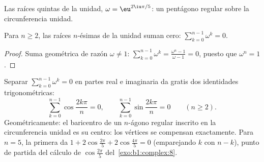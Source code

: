 \begin{omfigure}

{\small Las raíces quintas de la unidad, $\omega = \eu^{2\iu\pi/5}$:
un pentágono regular sobre la circunferencia unidad.}
\end{omfigure}

\begin{proposition}\label{prop:b1:complex:sumroots}
Para $n \geq 2$, las raíces $n$-ésimas de la unidad suman cero:
$\sum_{k=0}^{n-1} \omega^k = 0$.
\end{proposition}

\begin{proof}
Suma geométrica de razón $\omega \neq 1$:
$\sum_{k=0}^{n-1} \omega^k = \frac{\omega^n - 1}{\omega - 1} = 0$,
puesto que $\omega^n = 1$.
\end{proof}

\begin{example}\label{ex:b1:complex:sumrootsparts}
Separar $\sum_{k=0}^{n-1}\omega^k = 0$ en partes real e imaginaria da
gratis dos identidades trigonométricas:
\[
\sum_{k=0}^{n-1}\cos\frac{2k\pi}n = 0,
\qquad
\sum_{k=0}^{n-1}\sin\frac{2k\pi}n = 0
\qquad (n \geq 2).
\]
Geométricamente: el baricentro de un $n$-ágono regular inscrito en la
circunferencia unidad es su centro: los vértices se compensan
exactamente. Para $n = 5$, la primera da
$1 + 2\cos\frac{2\pi}5 + 2\cos\frac{4\pi}5 = 0$ (emparejando $k$ con
$n - k$), punto de partida del cálculo de $\cos\frac{2\pi}5$
del~\cref{exo:b1:complex:8}.
\end{example}

